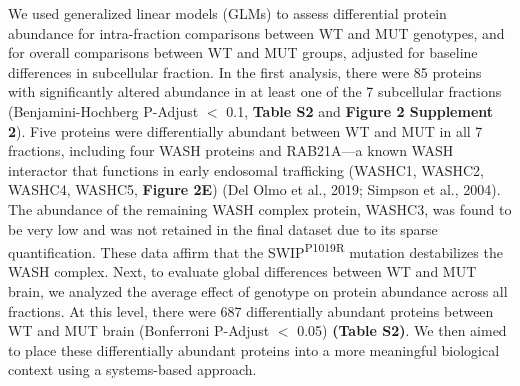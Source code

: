 We used generalized linear models (GLMs) to assess differential protein
abundance for intra-fraction comparisons between WT and MUT genotypes, and for
overall comparisons between WT and MUT groups, adjusted for baseline differences
in subcellular fraction. In the first analysis, there were 85 proteins with
significantly altered abundance in at least one of the 7 subcellular fractions
(Benjamini-Hochberg P-Adjust $<$ 0.1, \textbf{Table S2} and 
\textbf{Figure 2 Supplement 2}). Five proteins were differentially abundant 
between WT and MUT in all 7 fractions, including four WASH proteins 
and RAB21A—a known WASH interactor that functions in early endosomal 
trafficking (WASHC1, WASHC2, WASHC4, WASHC5, \textbf{Figure 2E}) 
(Del Olmo et al., 2019; Simpson et al., 2004). The abundance of the
remaining WASH complex protein, WASHC3, was found to be very low and was not
retained in the final dataset due to its sparse quantification. These data
affirm that the SWIP\textsuperscript{P1019R} mutation destabilizes the WASH complex. Next, to
evaluate global differences between WT and MUT brain, we analyzed the average
effect of genotype on protein abundance across all fractions. At this level,
there were 687 differentially abundant proteins between WT and MUT brain
(Bonferroni P-Adjust $<$ 0.05) \textbf{(Table S2)}. We then aimed to place these
differentially abundant proteins into a more meaningful biological context using
a systems-based approach.

